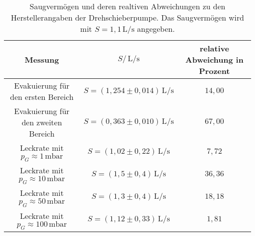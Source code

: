 \begin{table}
    \centering
    \caption{Saugvermögen und deren realtiven Abweichungen zu den Herstellerangaben der Drehschieberpumpe. Das
    Saugvermögen wird mit $S=1,1\,\si{\liter\per\second}$ angegeben.}
    \label{tab:S2}
    \begin{tabular}{c c c}
        \toprule
        Messung & $S/\,\si{\liter\per\second}$ & relative Abweichung in Prozent \\
        \midrule
        Evakuierung für den ersten Bereich & $S = (1,254 \pm 0,014)\,\si{\liter\per\second}$ & $14,00$ \\
        Evakuierung für den zweiten Bereich & $S = (0,363 \pm 0,010)\,\si{\liter\per\second}$ & $67,00$ \\
        Leckrate mit $p_G \approx 1 \,\si{\milli\bar}$ & $S = (1,02 \pm 0,22)\,\si{\liter\per\second}$ & $7,72$\\
        Leckrate mit $p_G \approx 10 \,\si{\milli\bar}$ & $S = (1,5 \pm 0,4)\,\si{\liter\per\second}$ & $36,36$\\
        Leckrate mit $p_G \approx 50 \,\si{\milli\bar}$ & $S = (1,3 \pm 0,4)\,\si{\liter\per\second}$ & $18,18$\\
        Leckrate mit $p_G \approx 100 \,\si{\milli\bar}$ & $S = (1,12 \pm 0,33)\,\si{\liter\per\second}$ & $1,81$\\
        \bottomrule
    \end{tabular}
\end{table}